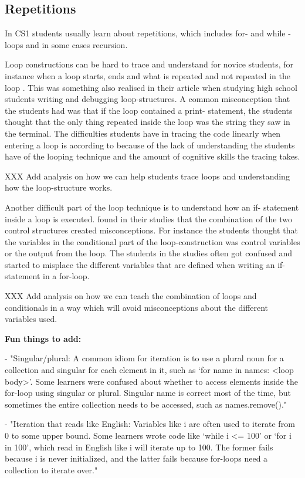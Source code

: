 \subsection{Repetitions}

In CS1 students usually learn about repetitions, which includes for- and while
-loops and in some cases recursion.

Loop constructions can be hard to trace and understand for novice students, 
for instance when a loop starts, ends and what is repeated and not repeated 
in the loop \parencite{Sekiya2013,KumarVeerasamy2016,Kaczmarczyk2010}. This 
was something \textcite{Sleeman1984} also realised in their article when 
studying high school students writing and debugging loop-structures. A common 
misconception that the students had was that if the loop contained a print-
statement, the students thought that the only thing  repeated inside the loop 
was the string they saw in the terminal. The difficulties students have in 
tracing the code linearly when entering a loop is according to \textcite{
KumarVeerasamy2016} because of the lack of understanding the students have of 
the looping technique and the amount of cognitive skills the tracing takes.

XXX Add analysis on how we can help students trace loops and understanding 
how the loop-structure works.

Another difficult part of the loop technique is to understand how an if-
statement inside a loop is executed. \textcite{Sekiya2013} found in their 
studies that the combination of the two control structures created 
misconceptions. For instance the students thought that the variables in the 
conditional part of the loop-construction was control variables or the output 
from the loop. The students in the studies often got confused and started to 
misplace the different variables that are defined when writing an if-
statement in a for-loop.

XXX Add analysis on how we can teach the combination of loops and 
conditionals in a way which will avoid misconceptions about the different 
variables used. 


\textbf{Fun things to add:}

- "Singular/plural: A common idiom for iteration is to use a plural noun for 
a collection and singular for each element in it, such as ‘for name in names: 
<loop body>’. Some learners were confused about whether to access elements 
inside the for-loop using singular or plural. Singular name is correct most 
of the time, but sometimes the entire collection needs to be accessed, such 
as names.remove()." \parencite{GuoMarkelZhang2020}

- "Iteration that reads like English: Variables like i are often used to 
iterate from 0 to some upper bound. Some learners wrote code like ‘while i <= 
100’ or ‘for i in 100’, which read in English like i will iterate up to 100. 
The former fails because i is never initialized, and the latter fails because 
for-loops need a collection to iterate over." \parencite{GuoMarkelZhang2020}